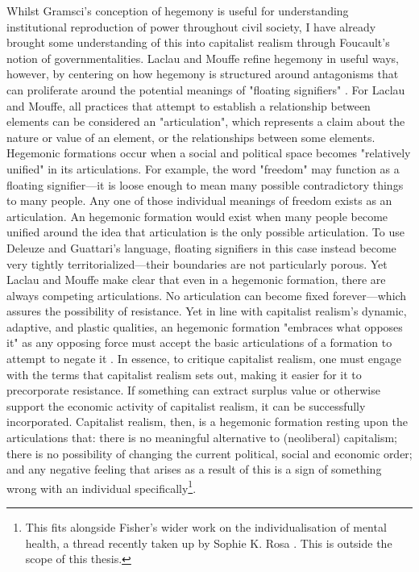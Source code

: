 Whilst Gramsci's conception of hegemony is useful for understanding institutional reproduction of power throughout civil society, I have already brought some understanding of this into capitalist realism through Foucault's notion of governmentalities. Laclau and Mouffe refine hegemony in useful ways, however, by centering on how hegemony is structured around antagonisms that can proliferate around the potential meanings of "floating signifiers" \citep[p. 136]{laclau_hegemony_2001}. For Laclau and Mouffe, all practices that attempt to establish a relationship between elements can be considered an "articulation", which represents a claim about the nature or value of an element, or the relationships between some elements. Hegemonic formations occur when a social and political space becomes "relatively unified" \citeyearpar[p. 136]{laclau_hegemony_2001} in its articulations. For example, the word "freedom" may function as a floating signifier—it is loose enough to mean many possible contradictory things to many people. Any one of those individual meanings of freedom exists as an articulation. An hegemonic formation would exist when many people become unified around the idea that articulation is the only possible articulation. To use Deleuze and Guattari's language, floating signifiers in this case instead become very tightly territorialized—their boundaries are not particularly porous. Yet Laclau and Mouffe make clear that even in a hegemonic formation, there are always competing articulations. No articulation can become fixed forever—which assures  the possibility of resistance. Yet in line with capitalist realism's dynamic, adaptive, and plastic qualities, an hegemonic formation "embraces what opposes it" as any opposing force must accept the basic articulations of a formation to attempt to negate it \citep[p. 139]{laclau_hegemony_2001}. In essence, to critique capitalist realism, one must engage with the terms that capitalist realism sets out, making it easier for it to precorporate resistance.  If something can extract surplus value or otherwise support the economic activity of capitalist realism, it can be successfully incorporated. Capitalist realism, then, is a hegemonic formation resting upon the articulations that: there is no meaningful alternative to (neoliberal) capitalism; there is no possibility of changing the current political, social and economic order; and any negative feeling that arises as a result of this is a sign of something wrong with an individual specifically\footnote{This fits alongside Fisher's wider work on the individualisation of mental health, a thread recently taken up by Sophie K. Rosa \citeyearpar{rosa_radical_2023}. This is outside the scope of this thesis.}. 

